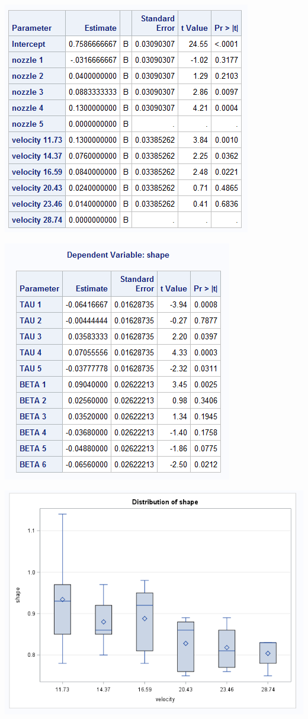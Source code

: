 \documentclass{article}\usepackage[]{graphicx}\usepackage[]{color}
\begin{document}
\includegraphics{PROB4EST}

\includegraphics{prob4esttable}

\includegraphics{prob4velocity}
\end{document}
